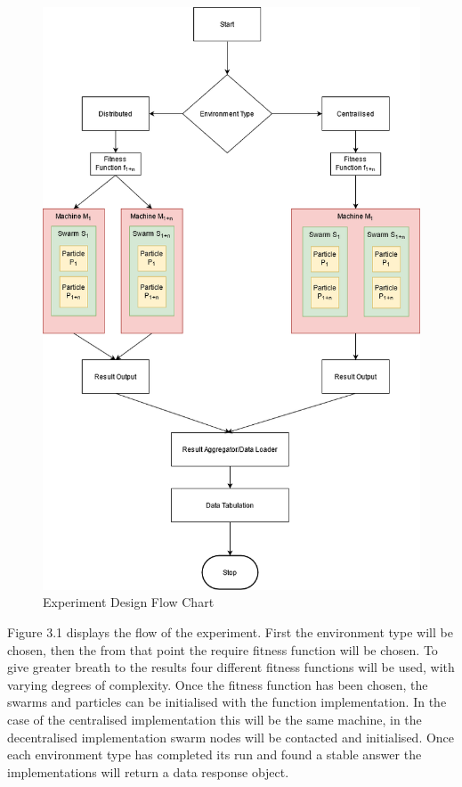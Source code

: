 \documentclass[oneside,12pt]{book}
\begin{document}
\begin{figure}[H]
    \centering
    \includegraphics[scale=0.6]{Images/ExperimentFlow.png}
    \caption{Experiment Design Flow Chart}
    \label{fig:Experiment Design Flow Chart}
\end{figure}
Figure 3.1 displays the flow of the experiment. First the environment type will be chosen, then the from that point the require fitness function will be chosen. To give greater breath to the results four different fitness functions will be used, with varying degrees of complexity. Once the fitness function has been chosen, the swarms and particles can be initialised with the function implementation. In the case of the centralised implementation this will be the same machine, in the decentralised implementation swarm nodes will be contacted and initialised. Once each environment type has completed its run and found a stable answer the implementations will return a data response object. 
\end{document}
